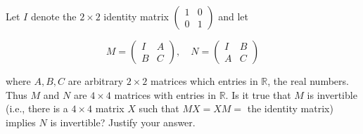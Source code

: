 Let $I$ denote the $2 \times 2$ identity matrix
$
\begin{pmatrix}
  1 & 0 \\
  0 & 1
\end{pmatrix}
$
and let

$$
  M = \begin{pmatrix}
        I & A \\
        B & C
      \end{pmatrix}, \quad
  N = \begin{pmatrix}
        I & B \\
        A & C
      \end{pmatrix}
$$

where $A, B, C$ are arbitrary $2 \times 2$ matrices which entries in
$\mathbb{R}$, the real numbers. Thus $M$ and $N$ are $4 \times 4$ matrices with
entries in $\mathbb{R}$. Is it true that $M$ is invertible (i.e., there is a $4
\times 4$ matrix $X$ such that $MX = XM =$ the identity matrix) implies $N$ is
invertible?  Justify your answer.
